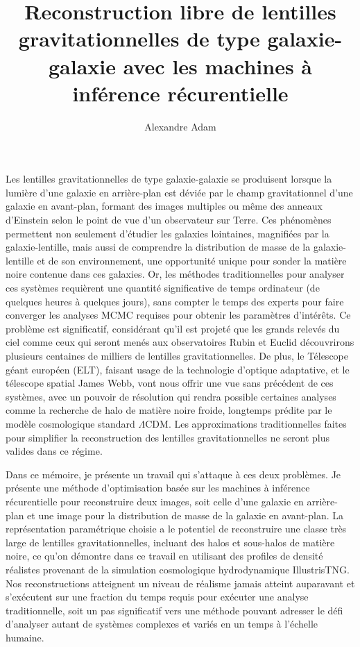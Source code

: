 \documentclass[
  normalmargins,
  11pt,
  openany,
  onehalfspacing,
]{ut-thesis}
\author{Alexandre Adam}
\title{Reconstruction libre de lentilles gravitationnelles de type galaxie-galaxie avec les machines à inférence récurentielle}
\begin{document}
  \frontmatter
    \maketitle
    \maketitletwo
    \begin{resume}
	Les lentilles gravitationnelles de type galaxie-galaxie se produisent lorsque la lumière d'une galaxie 
	en arrière-plan est déviée par le champ gravitationnel d'une galaxie en avant-plan, formant 
	des images multiples ou même des anneaux d'Einstein selon le point de vue d'un observateur sur Terre. 
	Ces phénomènes permettent non seulement 
	d'étudier les galaxies lointaines, magnifiées par la galaxie-lentille, mais aussi de comprendre la distribution 
	de masse de la galaxie-lentille et de son environnement, une opportunité unique pour 
	sonder la matière noire contenue dans ces galaxies. 
	Or, les méthodes traditionnelles pour analyser ces systèmes requièrent une quantité 
	significative de temps ordinateur (de quelques heures à quelques jours), sans compter le temps des 
	experts pour faire converger les analyses MCMC requises pour obtenir les paramètres d'intérêts. 
	Ce problème est significatif, considérant qu'il est projeté que  
	les grands relevés du ciel comme ceux qui seront menés aux observatoires Rubin et Euclid découvrirons plusieurs 
	centaines de milliers de lentilles gravitationnelles.  
	De plus, le Télescope géant européen (ELT), faisant usage de la technologie d'optique adaptative, 
	et le télescope spatial James Webb, vont nous offrir une vue sans précédent de ces systèmes, avec un 
	pouvoir de résolution qui rendra possible certaines analyses comme la recherche de halo de matière noire froide, 
	longtemps prédite par le modèle cosmologique standard $\Lambda$CDM. Les approximations traditionnelles faites pour 
	simplifier la reconstruction des lentilles gravitationnelles ne seront plus valides dans ce régime.

	Dans ce mémoire, je présente un travail qui s'attaque à ces deux problèmes. Je présente une 
	méthode d'optimisation basée sur les machines à inférence récurentielle pour reconstruire 
	deux images, soit celle d'une galaxie en arrière-plan et une image pour la distribution de masse 
	de la galaxie en avant-plan. La représentation paramétrique choisie a le potentiel de reconstruire 
	une classe très large de lentilles gravitationnelles, incluant des halos et sous-halos de matière noire, 
	ce qu'on démontre dans ce travail en utilisant des profiles de densité réalistes provenant de 
	la simulation cosmologique hydrodynamique IllustrisTNG. 
	Nos reconstructions atteignent un niveau de réalisme jamais atteint auparavant 
        et s'exécutent sur une fraction du temps requis pour exécuter une analyse traditionnelle, soit un pas 
	significatif vers une méthode pouvant adresser le défi d'analyser autant de systèmes complexes et variés en 
	un temps à l'échelle humaine.

    \end{resume}
\end{document}
